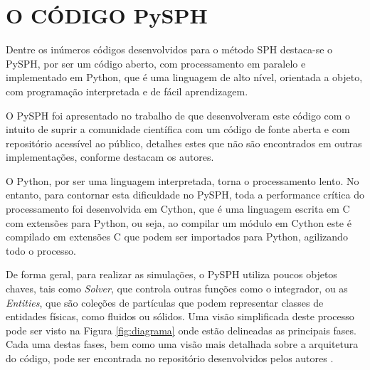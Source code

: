 \section{O CÓDIGO PySPH} \label{py}

Dentre os inúmeros códigos desenvolvidos para o método SPH destaca-se o PySPH, por ser um código aberto, com processamento em paralelo e implementado em Python, que é uma linguagem de alto nível, orientada a objeto, com programação interpretada e de fácil aprendizagem.

O PySPH foi apresentado no trabalho de  que desenvolveram este código com o intuito de suprir a comunidade científica com um código de fonte aberta e com repositório acessível ao público, detalhes estes que não são encontrados em outras implementações, conforme destacam os autores. 

O Python, por ser uma linguagem interpretada, torna o processamento lento. No entanto, para contornar esta dificuldade no PySPH, toda a performance crítica do processamento foi desenvolvida em Cython, que é uma linguagem escrita em C com extensões para Python, ou seja, ao compilar um módulo em Cython este é compilado em extensões C que podem ser importados para Python, agilizando todo o processo. 

De forma geral, para realizar as simulações, o PySPH utiliza poucos objetos chaves, tais como \textit{Solver}, que controla outras funções como o integrador, ou as \textit{Entities}, que são coleções de partículas que podem representar classes de entidades físicas, como fluidos ou sólidos. Uma visão simplificada deste processo pode ser visto na Figura \ref{fig:diagrama} onde estão delineadas as principais fases. Cada uma destas fases, bem como uma visão mais detalhada sobre a arquitetura do código, pode ser encontrada no repositório desenvolvidos pelos autores .


